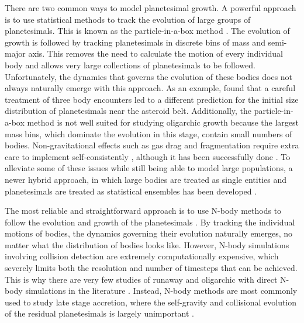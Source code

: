There are two common ways to model planetesimal growth. A powerful approach is to use statistical methods to track the 
evolution of large groups of planetesimals. This is known as the particle-in-a-box method \cite{greenberg78, wetherill89}. The 
evolution of growth is followed by tracking planetesimals in discrete bins of mass and semi-major axis. This removes the need to 
calculate the motion of every individual body and allows very large collections of planetesimals to be followed. Unfortunately, the 
dynamics that governs the evolution of these bodies does not always naturally emerge with this approach. As an example, 
\cite{weidenschilling11} found that a careful treatment of three body encounters led to a different prediction for the initial size 
distribution of planetesimals near the asteroid belt. Additionally, the particle-in-a-box method is not well suited for studying 
oligarchic growth because the largest mass bins, which dominate the evolution in this stage, contain small numbers of bodies. 
Non-gravitational effects such as gas drag and fragmentation require extra care to implement self-consistently 
\cite{leinhardt08}, although it has been successfully done \cite{wetherill93, chambers01}. To alleviate some of these issues 
while still being able to model large populations, a newer hybrid approach, in which large bodies are treated as single entities 
and planetesimals are treated as statistical ensembles has been developed 
\cite{weidenschilling97, kenyon06, levison12, morishima15}.

The most reliable and straightforward approach is to use N-body methods to follow the evolution and growth of the planetesimals 
\cite{lecar86}. By tracking the individual motions of bodies, the dynamics governing their evolution naturally emerges, no matter 
what the distribution of bodies looks like. However, N-body simulations involving collision detection are extremely 
computationally expensive, which severely limits both the resolution and number of timesteps that can be achieved. This is why 
there are very few studies of runaway and oligarchic with direct N-body simulations in the literature 
\cite{kokubo96, kokubo98, kokubo02, barnes09}. Instead, N-body methods are most commonly used to study late stage 
accretion, where the self-gravity and collisional evolution of the residual planetesimals is largely unimportant 
\cite{chambers98, agnor99,  chambers01, obrien06, morbidelli09}.

